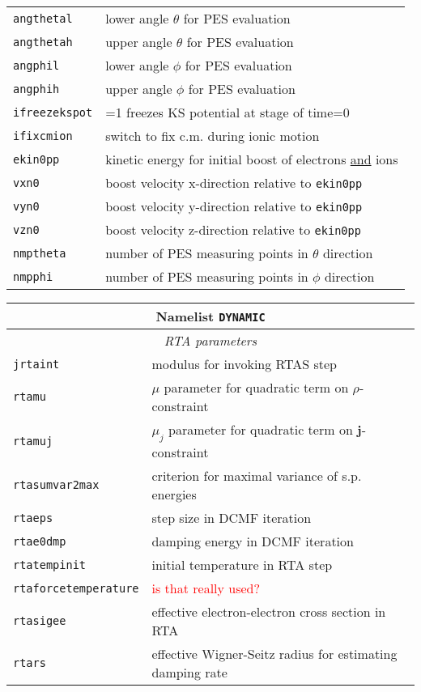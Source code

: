 \documentclass[12pt]{article}
\renewcommand{\vec}[1]{\mathbf #1}
\begin{document}
\begin{tabular}{ll}
{\tt angthetal} & lower angle  $\theta$ for PES evaluation \\
{\tt angthetah} & upper angle  $\theta$ for PES evaluation  \\
{\tt angphil} &  lower angle  $\phi$ for PES evaluation \\
{\tt angphih} &  upper angle  $\phi$ for PES evaluation \\
{\tt ifreezekspot} &  =1 freezes KS potential at stage of time=0\\
{\tt ifixcmion} & switch to fix c.m. during ionic motion \\
{\tt ekin0pp} & kinetic energy for initial boost of electrons
\underline{and} ions \\
{\tt vxn0} & boost velocity x-direction relative to {\tt ekin0pp} \\
{\tt vyn0} & boost velocity y-direction relative to {\tt ekin0pp}  \\
{\tt vzn0} &  boost velocity z-direction relative to {\tt ekin0pp} \\
{\tt nmptheta} &  number of PES measuring points in $\theta$ direction  \\
{\tt nmpphi} &   number of PES measuring points in $\phi$ direction  \\
\hline
\end{tabular}

\begin{tabular}{ll}
\hline
\multicolumn{2}{c}{Namelist {\tt DYNAMIC}} in {\tt for005.<name>} \\
\hline
\multicolumn{2}{c}{\it RTA parameters} \\
\hline
{\tt jrtaint} & modulus for invoking RTAS step \\
{\tt rtamu} &  $\mu$ parameter for quadratic term on $\rho$-constraint\\
{\tt rtamuj} &  $\mu_j$ parameter for quadratic term on $\vec{j}$-constraint \\
{\tt rtasumvar2max} & criterion for maximal variance of s.p. energies \\
{\tt rtaeps} & step size in DCMF iteration\\
{\tt rtae0dmp} & damping energy in DCMF iteration \\
{\tt rtatempinit} & initial temperature in RTA step \\
{\tt rtaforcetemperature} & \textcolor{red}{is that really used?} \\
{\tt rtasigee} & effective electron-electron cross section in RTA \\
{\tt rtars} & effective Wigner-Seitz radius for estimating damping rate \\
\hline
\end{tabular}
\end{document}
